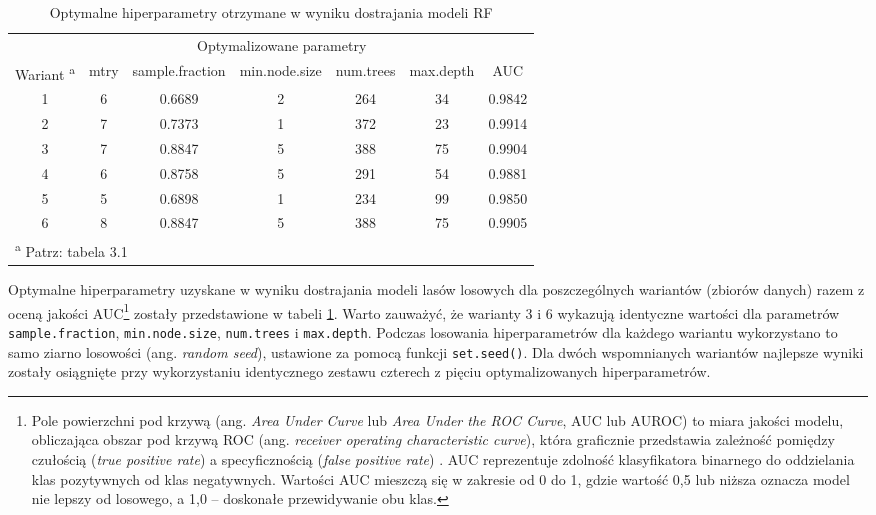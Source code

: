 \documentclass{amuthesis}
\begin{document}
\hypertarget{tbl-tabela-tuning}{}
\begin{table}
\caption{\label{tbl-tabela-tuning}Optymalne hiperparametry otrzymane w wyniku dostrajania modeli RF }\tabularnewline

\centering
\begin{tabular}{ccccccc}
\toprule
\multicolumn{1}{c}{ } & \multicolumn{5}{c}{Optymalizowane parametry} & \multicolumn{1}{c}{ } \\
\cmidrule(l{3pt}r{3pt}){2-6}
Wariant \textsuperscript{a} & mtry & sample.fraction & min.node.size & num.trees & max.depth & AUC\\
\midrule
1 & 6 & 0.6689 & 2 & 264 & 34 & 0.9842\\
2 & 7 & 0.7373 & 1 & 372 & 23 & 0.9914\\
3 & 7 & 0.8847 & 5 & 388 & 75 & 0.9904\\
4 & 6 & 0.8758 & 5 & 291 & 54 & 0.9881\\
5 & 5 & 0.6898 & 1 & 234 & 99 & 0.9850\\
6 & 8 & 0.8847 & 5 & 388 & 75 & 0.9905\\
\bottomrule
\multicolumn{7}{l}{\textsuperscript{a} Patrz: tabela 3.1}\\
\end{tabular}
\end{table}

Optymalne hiperparametry uzyskane w wyniku dostrajania modeli lasów
losowych dla poszczególnych wariantów (zbiorów danych) razem z oceną
jakości AUC\footnote{Pole powierzchni pod krzywą (ang. \emph{Area Under
  Curve} lub \emph{Area Under the ROC Curve}, AUC lub AUROC) to miara
  jakości modelu, obliczająca obszar pod krzywą ROC (ang. \emph{receiver
  operating characteristic curve}), która graficznie przedstawia
  zależność pomiędzy czułością (\emph{true positive rate}) a
  specyficznością (\emph{false positive rate})
  \autocite{jaworski_2013_perfomance_measures}. AUC reprezentuje
  zdolność klasyfikatora binarnego do oddzielania klas pozytywnych od
  klas negatywnych. Wartości AUC mieszczą się w zakresie od 0 do 1,
  gdzie wartość 0,5 lub niższa oznacza model nie lepszy od losowego, a
  1,0 -- doskonałe przewidywanie obu klas.} zostały przedstawione w
tabeli \ref{tbl-tabela-tuning}. Warto zauważyć, że warianty 3 i 6
wykazują identyczne wartości dla parametrów \texttt{sample.fraction},
\texttt{min.node.size}, \texttt{num.trees} i \texttt{max.depth}. Podczas
losowania hiperparametrów dla każdego wariantu wykorzystano to samo
ziarno losowości (ang. \emph{random seed}), ustawione za pomocą funkcji
\texttt{set.seed()}. Dla dwóch wspomnianych wariantów najlepsze wyniki
zostały osiągnięte przy wykorzystaniu identycznego zestawu czterech z
pięciu optymalizowanych hiperparametrów.
\end{document}
